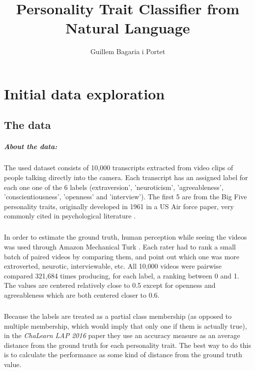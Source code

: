 \documentclass[12pt,a4paper]{report}
\author{Guillem Bagaria i Portet}
\title{Personality Trait Classifier from Natural Language}
\begin{document}
\doublespacing
\maketitle
\tableofcontents
\singlespacing
\chapter{Initial data exploration}

\section{The data}

\paragraph{About the data:} 

\paragraph{} The used dataset consists of 10,000 transcripts extracted from video clips of people talking directly into the camera. Each transcript has an assigned label for each one one of the 6 labels (extraversion', 'neuroticism', 'agreeableness', 'conscientiousness', 'openness' and 'interview'). The first 5 are from the Big Five personality traits, originally developed in 1961 in a US Air force paper, very commonly cited in psychological literature \cite{bigFive}.
\paragraph{} In order to estimate the ground truth, human perception while seeing the videos was used through Amazon Mechanical Turk \cite{chalearn}. Each rater had to rank a small batch of paired videos by comparing them, and point out which one was more extroverted, neurotic, interviewable, etc. All 10,000 videos were pairwise compared 321,684 times producing, for each label, a ranking between 0 and 1. The values are centered relatively close to 0.5 except for openness and agreeableness which are both centered closer to 0.6.

\paragraph{}  Because the labels are treated as a partial class membership (as opposed to multiple membership, which would imply that only one if them is actually true), in the \emph{ChaLearn LAP 2016} paper they use an accuracy measure as an average distance from the ground truth for each personality trait. The best way to do this is to calculate the performance as some kind of distance from the ground truth value.
\end{document}
